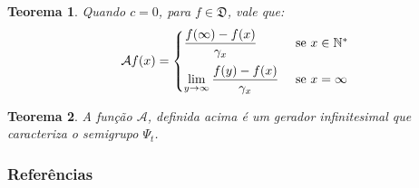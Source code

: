 \documentclass[xcolor=pdftex,dvipsnames]{beamer}
\newcommand{\AAA}{{\mathcal{A}}}
\newcommand{\DDD}{{\mathfrak{D}}}
\newcommand{\Nz}{{\mathbb{N^*}}}
\newtheorem{teorema}{Teorema}
\begin{document}
\begin{frame}

  \begin{teorema}
    Quando $c = 0$, para $f \in \DDD$, vale que:
    \begin{displaymath}
      \AAA f (x) = \begin{cases}
        \displaystyle
        \frac{f(\infty) - f(x)}{\gamma_x} & \text{ se } x \in \Nz \vspace{2mm}\\
        \displaystyle
        \lim_{y \to \infty} \frac{f(y) - f(x)}{\gamma_x} & \text{ se } x=\infty\\
      \end{cases}
    \end{displaymath}
  \end{teorema}
  \pause
  \begin{teorema}
    A função $\AAA$, definida acima é um gerador infinitesimal que
    caracteriza o semigrupo $\Psi_t$.
  \end{teorema}
\end{frame}



\begin{frame}[plain]
  \frametitle{Referências}
   
   
\end{frame}
\end{document}

